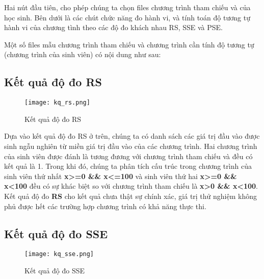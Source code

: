 Hai nút đầu tiên, cho phép chúng ta chọn files chương trình tham chiếu và của học sinh. Bên dưới là các chút chức năng đo hành vi, và tính toán độ tương tự hành vi của chương tình theo các độ đo khách nhau RS, SSE và PSE.

Một số files mẫu chương trình tham chiếu và chương trình cần tính độ tương tự (chương trình của sinh viên) có nội dung như sau:





\subsection{Kết quả độ đo RS}
\begin{center}
	\begin{figure}[htp]
		\begin{center}
			\texttt{[image: kq\_rs.png]}
		\end{center}
		\caption{Kết quả độ đo RS}		
	\end{figure}
\end{center}

Dựa vào kết quả độ đo RS ở trên, chúng ta có danh sách các giá trị đầu vào được sinh ngẫu nghiên từ miền giá trị đầu vào của các chương trình. Hai chương trình của sinh viên được đánh là tương đương với chương trình tham chiếu và đều có kết quả là 1. Trong khi đó, chúng ta phân tích cấu trúc trong chương trình của sinh viên thứ nhất \textbf{x>=0 \&\& x<=100} và sinh viên thứ hai \textbf{x>=0 \&\& x<100} đều có sự khác biệt so với chương trình tham chiếu là \textbf{x>0 \&\& x<100}. Kết quả độ đo \textbf{RS} cho kết quả chưa thật sự chính xác, giá trị thử nghiệm không phủ được hết các trường hợp chương trình có khả năng thực thi.

\subsection{Kết quả độ đo SSE}
\begin{center}
	\begin{figure}[htp]
		\begin{center}
			\texttt{[image: kq\_sse.png]}
		\end{center}
		\caption{Kết quả độ đo SSE}		
	\end{figure}
\end{center}

